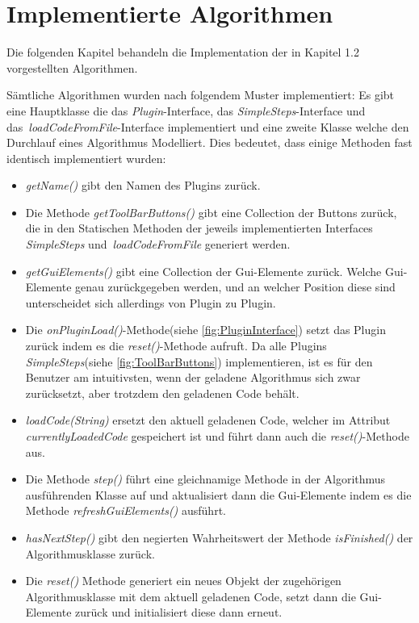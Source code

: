\section{Implementierte Algorithmen}
Die folgenden Kapitel behandeln die Implementation der in Kapitel 1.2 vorgestellten
Algorithmen.

Sämtliche Algorithmen wurden nach folgendem Muster implementiert:
Es gibt eine Hauptklasse die das \textit{Plugin}-Interface, das 
\textit{SimpleSteps}-Interface und das \textit{loadCodeFromFile}-Interface 
implementiert und eine zweite Klasse welche den Durchlauf eines Algorithmus
Modelliert. Dies bedeutet, dass einige Methoden fast identisch implementiert wurden:

\begin{itemize}
  \item \textit{getName()} gibt den Namen des Plugins zurück.

  \item Die Methode \textit{getToolBarButtons()} gibt eine Collection der Buttons zurück,
    die in den Statischen Methoden der jeweils implementierten Interfaces 
    \textit{SimpleSteps} und \textit{loadCodeFromFile} generiert werden.

  \item \textit{getGuiElements()} gibt eine Collection der Gui-Elemente zurück.
    Welche Gui-Elemente genau zurückgegeben werden, und an welcher Position diese
    sind unterscheidet sich allerdings von Plugin zu Plugin.

  \item Die \textit{onPluginLoad()}-Methode(siehe \cref{fig:PluginInterface}) 
    setzt das Plugin zurück indem es die \textit{reset()}-Methode aufruft.
    Da alle Plugins \textit{SimpleSteps}(siehe \cref{fig:ToolBarButtons}) implementieren,
    ist es für den Benutzer am intuitivsten, wenn der geladene Algorithmus sich zwar
    zurücksetzt, aber trotzdem den geladenen Code behält.

  \item \textit{loadCode(String)} ersetzt den aktuell geladenen Code, welcher im Attribut
    \textit{currentlyLoadedCode} gespeichert ist und führt dann auch die 
    \textit{reset()}-Methode aus.

  \item Die Methode \textit{step()} führt eine gleichnamige Methode in der
    Algorithmus ausführenden Klasse auf und aktualisiert dann die Gui-Elemente 
    indem es die Methode \textit{refreshGuiElements()} ausführt.

  \item \textit{hasNextStep()} gibt den negierten Wahrheitswert der Methode 
    \textit{isFinished()} der Algorithmusklasse zurück.

  \item Die \textit{reset()} Methode generiert ein neues Objekt der zugehörigen
    Algorithmusklasse mit dem aktuell geladenen Code, setzt dann die 
    Gui-Elemente zurück und initialisiert diese dann erneut.
\end{itemize}


